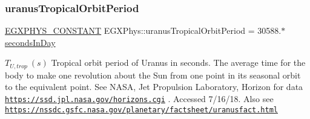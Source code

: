 \subsubsection{\texorpdfstring{uranus\+Tropical\+Orbit\+Period}{uranusTropicalOrbitPeriod}}
{\footnotesize\ttfamily \mbox{\hyperlink{group___e_g_x_phys-_constants-_macros_ga76980d288494ce1714c9ac68a95ba702}{E\+G\+X\+P\+H\+Y\+S\+\_\+\+C\+O\+N\+S\+T\+A\+NT}} E\+G\+X\+Phys\+::uranus\+Tropical\+Orbit\+Period = 30588.$\ast$\mbox{\hyperlink{namespace_e_g_x_phys_a93d2a00d75411b58cbf63ab3fd1f8bc2}{seconds\+In\+Day}}}

$ T_{U,trop} \ (s)$ Tropical orbit period of Uranus in seconds. The average time for the body to make one revolution about the Sun from one point in its seasonal orbit to the equivalent point. See N\+A\+SA, Jet Propulsion Laboratory, Horizon for data \href{https://ssd.jpl.nasa.gov/horizons.cgi}{\tt https\+://ssd.\+jpl.\+nasa.\+gov/horizons.\+cgi} . Accessed 7/16/18. Also see \href{https://nssdc.gsfc.nasa.gov/planetary/factsheet/uranusfact.html}{\tt https\+://nssdc.\+gsfc.\+nasa.\+gov/planetary/factsheet/uranusfact.\+html} 
